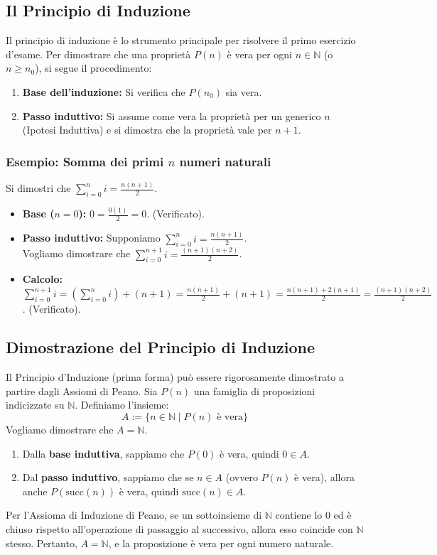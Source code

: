 \documentclass[12pt, a4paper]{article}
\begin{document}
\subsection{Il Principio di Induzione}
Il principio di induzione è lo strumento principale per risolvere il primo esercizio d'esame. Per dimostrare che una proprietà $P(n)$ è vera per ogni $n \in \mathbb{N}$ (o $n \geq n_0$), si segue il procedimento:
\begin{enumerate}
    \item \textbf{Base dell'induzione:} Si verifica che $P(n_0)$ sia vera.
    \item \textbf{Passo induttivo:} Si assume come vera la proprietà per un generico $n$ (Ipotesi Induttiva) e si dimostra che la proprietà vale per $n+1$.
\end{enumerate}



\subsubsection{Esempio: Somma dei primi $n$ numeri naturali}
Si dimostri che $\sum_{i=0}^{n} i = \frac{n(n+1)}{2}$.
\begin{itemize}
    \item \textbf{Base ($n=0$):} $0 = \frac{0(1)}{2} = 0$. (Verificato).
    \item \textbf{Passo induttivo:} Supponiamo $\sum_{i=0}^{n} i = \frac{n(n+1)}{2}$. \\ Vogliamo dimostrare che $\sum_{i=0}^{n+1} i = \frac{(n+1)(n+2)}{2}$.
    \item \textbf{Calcolo:} $\sum_{i=0}^{n+1} i = \left(\sum_{i=0}^{n} i\right) + (n+1) = \frac{n(n+1)}{2} + (n+1) = \frac{n(n+1) + 2(n+1)}{2} = \frac{(n+1)(n+2)}{2}$. (Verificato).
\end{itemize}


\subsection{Dimostrazione del Principio di Induzione}
Il Principio d'Induzione (prima forma) può essere rigorosamente dimostrato a partire dagli Assiomi di Peano. 
Sia $P(n)$ una famiglia di proposizioni indicizzate su $\mathbb{N}$. Definiamo l'insieme:
\[ A := \{n \in \mathbb{N} \mid P(n) \text{ è vera}\} \]
Vogliamo dimostrare che $A = \mathbb{N}$.
\begin{enumerate}
    \item Dalla \textbf{base induttiva}, sappiamo che $P(0)$ è vera, quindi $0 \in A$.
    \item Dal \textbf{passo induttivo}, sappiamo che se $n \in A$ (ovvero $P(n)$ è vera), allora anche $P(\text{succ}(n))$ è vera, quindi $\text{succ}(n) \in A$.
\end{enumerate}
Per l'Assioma di Induzione di Peano, se un sottoinsieme di $\mathbb{N}$ contiene lo $0$ ed è chiuso rispetto all'operazione di passaggio al successivo, allora esso coincide con $\mathbb{N}$ stesso. Pertanto, $A = \mathbb{N}$, e la proposizione è vera per ogni numero naturale.
\end{document}
